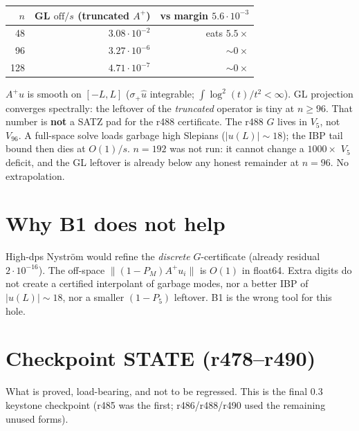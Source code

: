 \documentclass[11pt]{article}
\theoremstyle{remark}
\begin{document}
\begin{center}
\small
\begin{tabular}{@{}rrr@{}}
\toprule
$n$ & GL $\mathrm{off}/s$ (truncated $A^+$)
  & vs margin $5.6\cdot10^{-3}$ \\
\midrule
48 & $3.08\cdot10^{-2}$ & eats $5.5\times$ \\
96 & $3.27\cdot10^{-6}$ & $\sim0\times$ \\
128 & $4.71\cdot10^{-7}$ & $\sim0\times$ \\
\bottomrule
\end{tabular}
\end{center}

$A^+u$ is smooth on $[-L,L]$
($\sigma_+\hat u$ integrable;
$\int\log^2(t)/t^2<\infty$).
GL projection converges spectrally:
the leftover of the \emph{truncated} operator
is tiny at $n\ge96$.
That number is \textbf{not} a SATZ pad for
the r488 certificate.
The r488 $G$ lives in $V_5$, not $V_{96}$.
A full-space solve loads garbage high Slepians
($|u(L)|\sim18$); the IBP tail bound then
dies at $O(1)/s$.
$n=192$ was not run: it cannot change a
$1000\times$ $V_5$ deficit, and the GL leftover
is already below any honest remainder at $n=96$.
No extrapolation.

\section{Why B1 does not help}

High-dps Nystr\"om would refine the
\emph{discrete} $G$-certificate
(already residual $2\cdot10^{-16}$).
The off-space $\|(1-P_M)A^+u_i\|$ is
$O(1)$ in float64.
Extra digits do not create a certified
interpolant of garbage modes, nor a better
IBP of $|u(L)|\sim18$, nor a smaller
$(1-P_5)$ leftover.
B1 is the wrong tool for this hole.

\section{Checkpoint STATE (r478--r490)}

What is proved, load-bearing, and not to be
regressed.  This is the final $0.3$ keystone
checkpoint (r485 was the first; r486/r488/r490
used the remaining unused forms).
\end{document}
